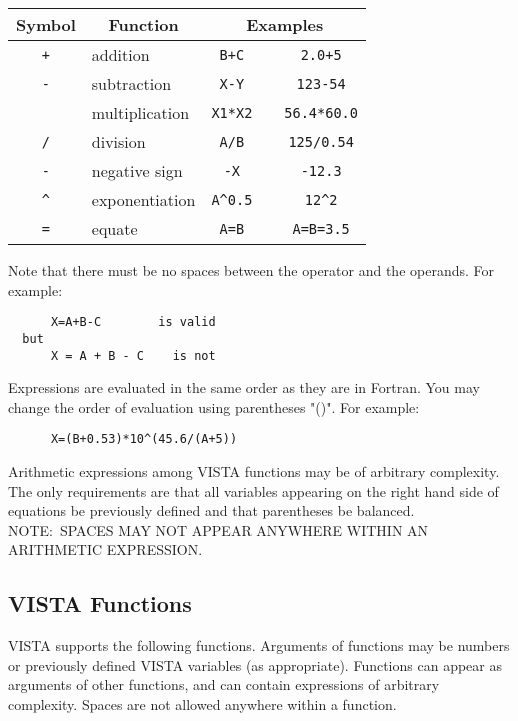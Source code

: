 \begin{center}
   \begin{tabular}{|c|l|ccc|} \hline
      Symbol&\multicolumn{1}{|c|}{Function}&
      \multicolumn{3}{c|}{Examples}\\ \hline
      {\tt +}&addition&{\tt B+C}&&{\tt 2.0+5}\\ \hline
      {\tt -}&subtraction&{\tt X-Y}&&{\tt 123-54}\\ \hline
      {\tt *}&multiplication&{\tt X1*X2}&&{\tt 56.4*60.0}\\ \hline
      {\tt /}&division&{\tt A/B}&&{\tt 125/0.54}\\ \hline
      {\tt -}&negative sign&{\tt -X}&&{\tt -12.3}\\ \hline
      {\verb+^+}&exponentiation&{\verb+A^0.5+}&&{\verb+12^2+}\\ \hline
      {\tt =}&equate&{\tt A=B}&&{\tt A=B=3.5}\\ \hline
   \end{tabular}
\end{center}

\noindent Note that there must be no spaces between the operator and the
operands.  For example:
\begin{verbatim}
      X=A+B-C        is valid
  but
      X = A + B - C    is not
\end{verbatim}

Expressions are evaluated in the same order as they are in Fortran. You may
change the order of evaluation using parentheses "()".  For example:
\begin{verbatim}
      X=(B+0.53)*10^(45.6/(A+5))
\end{verbatim}

\noindent Arithmetic expressions among VISTA functions may be of arbitrary
complexity.  The only requirements are that all variables appearing on the
right hand side of equations be previously defined and that parentheses be
balanced. NOTE:\ SPACES MAY NOT APPEAR ANYWHERE WITHIN AN ARITHMETIC
EXPRESSION.

\subsection{VISTA Functions}

VISTA supports the following functions.  Arguments of functions may be numbers
or previously defined VISTA variables (as appropriate).  Functions can appear
as arguments of other functions, and can contain expressions of arbitrary
complexity. Spaces are not allowed anywhere within a function.

